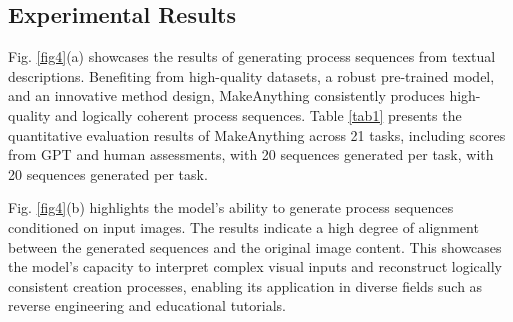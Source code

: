 




\subsection{Experimental Results}


Fig. \ref{fig4}(a) showcases the results of generating process sequences from textual descriptions. Benefiting from high-quality datasets, a robust pre-trained model, and an innovative method design, MakeAnything consistently produces high-quality and logically coherent process sequences. Table \ref{tab1} presents the quantitative evaluation results of MakeAnything across 21 tasks, including scores from GPT and human assessments, with 20 sequences generated per task, with 20 sequences generated per task.

Fig. \ref{fig4}(b) highlights the model's ability to generate process sequences conditioned on input images. The results indicate a high degree of alignment between the generated sequences and the original image content. This showcases the model's capacity to interpret complex visual inputs and reconstruct logically consistent creation processes, enabling its application in diverse fields such as reverse engineering and educational tutorials.

